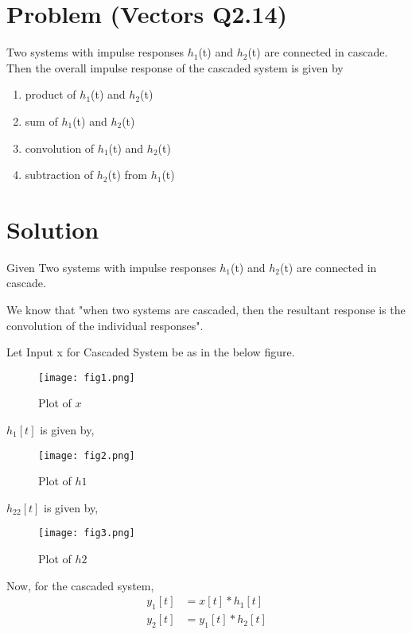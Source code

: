 \documentclass[journal,12pt,twocolumn]{IEEEtran}
\begin{document}
\section*{\textbf{Problem (Vectors Q2.14)}}
Two systems with impulse responses $h_1$(t) and $h_2$(t) are connected in cascade. Then the overall 
impulse response of the cascaded system is given by
\begin{enumerate}
   \item product of $h_1$(t) and $h_2$(t)
   \item sum of $h_1$(t) and $h_2$(t) 
   \item convolution of $h_1$(t) and $h_2$(t) 
   \item subtraction of $h_2$(t) from $h_1$(t) 
\end{enumerate}
\section*{\textbf{Solution}}

Given Two systems with impulse responses $h_1$(t) and $h_2$(t) are connected in cascade.

We know that "when two systems are cascaded, then the resultant response is the convolution of the individual responses".

Let Input x for Cascaded System be as in the below figure. \\

\begin{figure}[!ht]
    \centering
    \texttt{[image: fig1.png]}
    \caption{Plot of $x$}
    \label{x}
\end{figure}

$h_1[t]$ is given by,

\begin{figure}[H]
    \centering
    \texttt{[image: fig2.png]}
    \caption{Plot of $h1$}
    \label{h1}
\end{figure}

$h_22[t]$ is given by,

\begin{figure}[!h]
    \centering
    \texttt{[image: fig3.png]}
    \caption{Plot of $h2$}
    \label{h2}
\end{figure}

Now, for the cascaded system, 
\begin{align}
    y_1[t] &= x[t] * h_1[t] \\
    y_2[t] &= y_1[t] * h_2[t]
\end{align}
\end{document}
